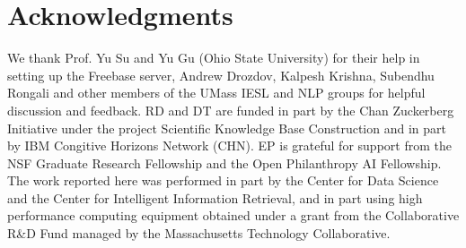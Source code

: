 \documentclass[11pt]{article}
\begin{document}
\section*{Acknowledgments}
We thank Prof. Yu Su  and Yu Gu (Ohio State University) for their help in setting up the Freebase server, Andrew Drozdov, Kalpesh Krishna, Subendhu Rongali and other members of the
UMass IESL and NLP groups for helpful discussion and feedback. RD and DT are funded in part by the Chan Zuckerberg Initiative under the project Scientific Knowledge Base Construction and in part by IBM Congitive Horizons Network (CHN).
EP is grateful for support from the NSF Graduate Research Fellowship and the Open Philanthropy AI Fellowship. The work reported here was performed in part by the Center for Data Science and the Center for Intelligent Information Retrieval, and in part using high performance computing equipment obtained under a grant from the Collaborative R\&D Fund managed by the Massachusetts Technology Collaborative.












































































\end{document}
